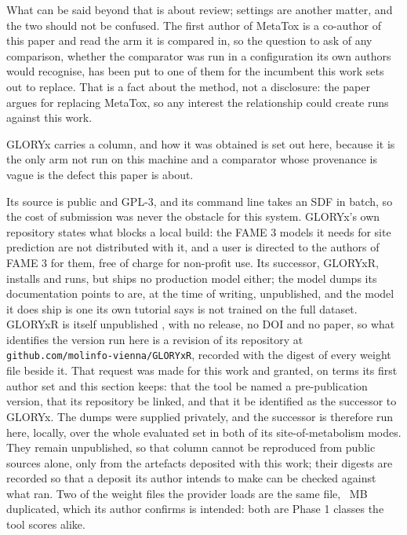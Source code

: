 \documentclass[journal=jcisd8,manuscript=suppinfo,layout=onecolumn]{achemso}
\begin{document}
What can be said beyond that is about review; settings are another matter, and the two should not
be confused. The first author of MetaTox \citep{Rudik_2017} is a co-author of this paper and read
the arm it is compared in, so the question to ask of any comparison, whether the comparator was
run in a configuration its own authors would recognise, has been put to one of them for the
incumbent this work sets out to replace. That is a fact about the method, not a disclosure:
the paper argues for replacing MetaTox, so any interest the relationship could create runs
against this work.

GLORYx carries a column, and how it was obtained is set out here, because it is the only arm
not run on this machine and a comparator whose provenance is vague is the defect this paper is
about.

Its source is public and GPL-3, and its command line takes an SDF in batch, so the cost of
submission was never the obstacle for this system. GLORYx's own repository states what blocks a
local build: the FAME 3 models it needs for site prediction are not distributed with it, and a user
is directed to the authors of FAME 3 for them, free of charge for non-profit use. Its successor,
GLORYxR, installs and runs, but ships no production model either; the model dumps its documentation
points to are, at the time of writing, unpublished, and the model it does ship is one its own
tutorial says is not trained on the full dataset. GLORYxR is itself unpublished
\citep{Gaskin_GLORYxR}, with no release, no DOI and no paper, so what identifies the version run
here is a revision of its repository at \texttt{github.com/molinfo-vienna/GLORYxR}, recorded with
the digest of every weight file beside it. That request was made for this work and granted, on
terms its first author set and this section keeps: that the tool be named a pre-publication
version, that its repository be linked, and that it be identified as the successor to GLORYx. The
dumps were supplied privately, and the successor is therefore run here, locally, over the whole
evaluated set in both of its site-of-metabolism modes. They remain unpublished, so that column
cannot be reproduced from public sources alone, only from the artefacts deposited with this work;
their digests are recorded so that a deposit its author intends to make can be checked against what
ran. Two of the \numGloryxrDumpsWord{} weight files the provider loads are the same file,
\numGloryxrDuplicatedmb{}~MB duplicated, which its author confirms is intended: both are Phase 1
classes the tool scores alike.
\end{document}
